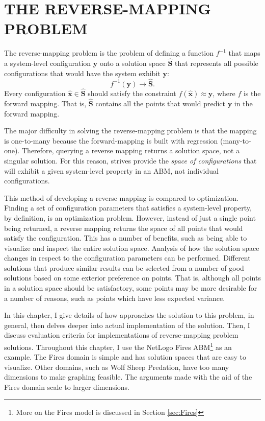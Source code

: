 \chapter{THE REVERSE-MAPPING PROBLEM}
\thispagestyle{plain}

\label{ReverseMapping}

The reverse-mapping problem is the problem of defining a function $f^{-1}$ that maps a system-level configuration $\mathbf y$ onto a solution space $\hat{\mathbf S}$ that represents all possible configurations that would have the system exhibit $\mathbf y$:
   \[ f^{-1}(\mathbf y) \rightarrow \hat{\mathbf S}. \]
Every configuration $\hat {\mathbf x} \in \hat {\mathbf S}$ should satisfy the constraint $f(\hat{\mathbf x}) \approx \mathbf y$, where $f$ is the forward mapping.
That is, $\hat{\mathbf S}$ contains all the points that would predict $\mathbf y$ in the forward mapping.

The major difficulty in solving the reverse-mapping problem is that the mapping is one-to-many because the forward-mapping is built with regression (many-to-one).
Therefore, querying a reverse mapping returns a solution space, not a singular solution.
For this reason, \fw strives provide the \textit{space of configurations} that will exhibit a given system-level property in an ABM, not individual configurations.

This method of developing a reverse mapping is compared to optimization.
Finding a set of configuration parameters that satisfies a system-level property, by definition, is an optimization problem.
However, instead of just a single point being returned, a reverse mapping returns the space of all points that would satisfy the configuration.
This has a number of benefits, such as being able to visualize and inspect the entire solution space.
Analysis of how the solution space changes in respect to the configuration parameters can be performed.
Different solutions that produce similar results can be selected from a number of good solutions based on some exterior preference on points.
That is, although all points in a solution space should be satisfactory, some points may be more desirable for a number of reasons, such as points which have less expected variance.

In this chapter, I give details of how \fw approaches the solution to this problem, in general, then delves deeper into actual implementation of the solution.
Then, I discuss evaluation criteria for implementations of reverse-mapping problem solutions.
Throughout this chapter, I use the NetLogo Fires ABM\footnote{More on the Fires model is discussed in Section \ref{sec:Fires}} as an example.
The Fires domain is simple and has solution spaces that are easy to visualize.
Other domains, such as Wolf Sheep Predation, have too many dimensions to make graphing feasible.
The arguments made with the aid of the Fires domain scale to larger dimensions.



